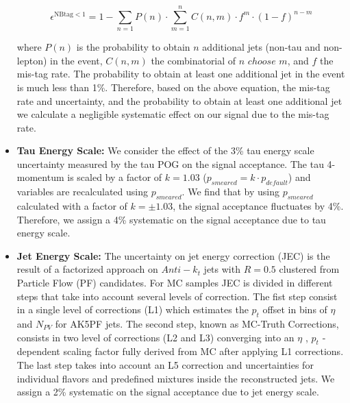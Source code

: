 \begin{itemize}
\begin{equation}\label{eq:nttbar}
  \epsilon^{\textrm{NBtag} < 1} = 1 - \sum_{n=1} P(n) \cdot \sum_{m=1}^{n} C(n,m) \cdot f^{m} \cdot (1-f)^{n-m}
\end{equation}

where $P(n)$ is the probability to obtain $n$ additional jets (non-tau and non-lepton) in the event, $C(n,m)$ the combinatorial of $n$ $choose$ $m$, and $f$ the mis-tag rate. The probability to obtain at least one additional jet in the event is much less than 1\%. Therefore, based on the above equation, the mis-tag rate and uncertainty, and the probability to obtain at least one additional jet we calculate a negligible systematic effect on our signal due to the mis-tag rate.

  \item \textbf{Tau Energy Scale:} We consider the effect of the 3\% tau energy scale uncertainty measured by the tau POG on the signal acceptance. The tau 4-momentum is scaled by a factor of $k=1.03$ ($p_{smeared} = k \cdot p_{default}$) and variables are recalculated using $p_{smeared}$. We find that by using $p_{smeared}$ calculated with a factor of $k=\pm 1.03$, the signal acceptance fluctuates by 4\%. Therefore, we assign a 4\% systematic on the signal acceptance due to tau energy scale.
  \item \textbf{Jet Energy Scale:}  The uncertainty on jet energy correction (JEC) is the result of a factorized approach on $Anti­-k_{t}$ jets with $R=0.5$ clustered from Particle Flow (PF) candidates. For MC samples JEC is divided in different steps that take into account several levels of correction. The fist step consist in a single level of corrections (L1) which estimates the $p_{t}$ offset in bins of $\eta$ and $N_{PV}$ for AK5PF jets. The second step, known as MC-Truth Corrections, consists in two level of corrections (L2 and L3) converging into an $\eta$ , $p_{t}$ ­dependent scaling factor fully derived from MC after applying L1­ corrections. The last step takes into account an L5 correction and uncertainties for individual flavors and predefined mixtures inside the reconstructed jets. We assign a 2\% systematic on the signal acceptance due to jet energy scale.

\end{itemize}

